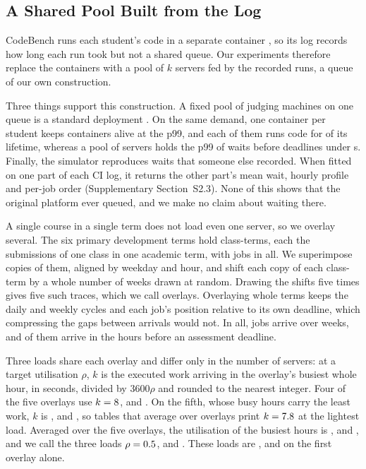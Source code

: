 \subsection{A Shared Pool Built from the Log}
\label{sec:overlay}
\label{sec:source_platform}
\label{sec:load}

CodeBench runs each student's code in a separate container \cite{codebench_home}, so its
log records how long each run took but not a shared queue. Our experiments therefore
replace the containers with a pool of $k$ servers fed by the recorded runs, a queue of our
own construction.

Three things support this construction. A fixed pool of judging machines on one queue is a
standard deployment \cite{domjudge_manual,peveler2019sandbox}. On the same demand, one
container per student keeps  containers alive at the p99, and each of them
runs code for  of its lifetime, whereas a pool of  servers holds
the p99 of waits before deadlines under  s. Finally, the simulator reproduces
waits that someone else recorded. When fitted on one part of each CI log, it returns the
other part's mean wait, hourly profile and per-job order (Supplementary Section~S2.3). None
of this shows that the original platform ever queued, and we make no claim about waiting
there.

A single course in a single term does not load even one server, so we overlay several. The
six primary development terms hold  class-terms, each the submissions of one class
in one academic term, with  jobs in all. We superimpose  copies
of them, aligned by weekday and hour, and shift each copy of each class-term by a whole
number of weeks drawn at random. Drawing the shifts five times gives five such traces, which
we call overlays. Overlaying whole
terms keeps the daily and weekly cycles and each job's position relative to its own
deadline, which compressing the gaps between arrivals would not. In all,
 jobs arrive over  weeks, and  of
them arrive in the  hours before an assessment deadline.

Three loads share each overlay and differ only in the number of servers: at a target
utilisation $\rho$, $k$ is the executed work arriving in the overlay's busiest whole hour,
in seconds, divided by $3600\rho$ and rounded to the nearest integer. Four of the five
overlays use $k = 8$,  and
. On the fifth, whose busy hours carry the least work, $k$ is ,
 and , so tables that average over overlays print $k = 7.8$ at
the lightest load. Averaged over the five overlays, the utilisation of the busiest hours is
,  and , and we call the three loads $\rho =
0.5$,  and . These loads are ,
 and  on the first overlay alone.

